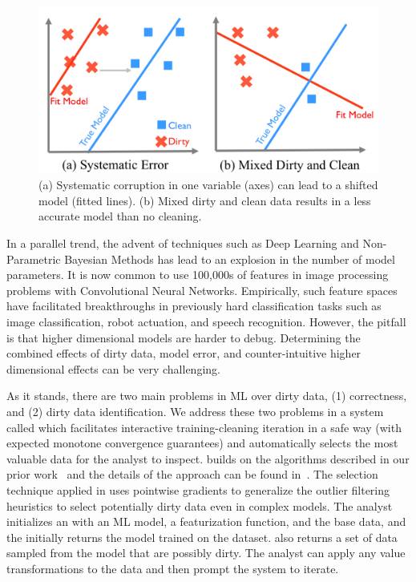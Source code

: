 \begin{figure}[t]
\centering
 \includegraphics[width=0.7\columnwidth]{figs/update-arch.png}
 \caption{(a) Systematic corruption in one variable (axes) can lead to a shifted model (fitted lines). 
 (b) Mixed dirty and clean data results in a less accurate model than no cleaning.\label{update-arch1}}\vspace{-2em}
\end{figure}

In a parallel trend, the advent of techniques such as Deep Learning and Non-Parametric Bayesian Methods has lead to an explosion in the number of model parameters.
It is now common to use 100,000s of features in image processing problems with Convolutional Neural Networks.
Empirically, such feature spaces have facilitated breakthroughs in previously hard classification tasks such as image classification, robot actuation, and speech recognition.
However, the pitfall is that higher dimensional models are harder to debug.
Determining the combined effects of dirty data, model error, and counter-intuitive higher dimensional effects can be very challenging.

As it stands, there are two main problems in ML over dirty data, (1) correctness, and (2) dirty data identification.
We address these two problems in a system called \sys which facilitates interactive training-cleaning iteration in a safe way (with expected monotone convergence guarantees) and automatically selects the most valuable data for the analyst to inspect.
\sys builds on the algorithms described in our prior work~\cite{krishnan2015svc, wang1999sample, DBLP:journals/pvldb/HaasKWF015, DBLP:journals/debu/KrishnanWFGKM015} and the details of the approach can be found in~\cite{activecleanarxiv}.
The selection technique applied in \sys uses pointwise gradients to generalize the outlier filtering heuristics to select potentially dirty data even in complex models. 
The analyst initializes an \sys with an ML model, a featurization function, and the base data, and the \sys initially returns the model trained on the dataset.
\sys also returns a set of data sampled from the model that are possibly dirty.
The analyst can apply any value transformations to the data and then prompt the system to iterate. 

